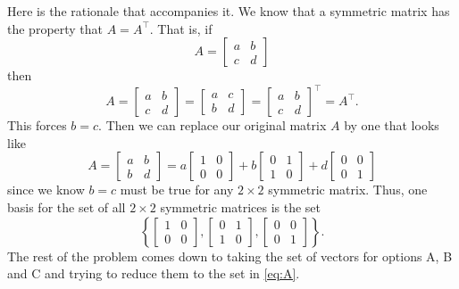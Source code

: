 \begin{questions}
\begin{solution}
    Here is the rationale that accompanies it. We know that a symmetric
    matrix has the property that $A=A^\intercal$. That is, if
    \[
      A=\begin{bmatrix}
        a&b\\c&d
        \end{bmatrix}
    \]
    then
    \[
      A=
      \begin{bmatrix}
        a&b\\c&d
      \end{bmatrix}
      =
      \begin{bmatrix}
        a&c\\b&d
      \end{bmatrix}
      =
      \begin{bmatrix}
        a&b\\c&d
      \end{bmatrix}^{\intercal}
      =A^{\intercal}.
    \]
    This forces $b=c$. Then we can replace our original matrix $A$ by one
    that looks like
    \[
      A=\begin{bmatrix}
        a&b\\
        b&d
      \end{bmatrix}=
      a\begin{bmatrix}
        1&0\\
        0&0
      \end{bmatrix}+
      b\begin{bmatrix}
        0&1\\
        1&0
      \end{bmatrix}+
      d\begin{bmatrix}
        0&0\\
        0&1
      \end{bmatrix}
    \]
    since we know $b=c$ must be true for any $2\times 2$ symmetric matrix.
    Thus, one basis for the set of all $2\times 2$ symmetric matrices is
    the set
    \[
      \label{eq:A}
      \tag{$\star$} \left\{
        \begin{bmatrix}1&0\\0&0\end{bmatrix},
        \begin{bmatrix}0&1\\1&0\end{bmatrix},
        \begin{bmatrix}0&0\\0&1\end{bmatrix} \right\}.
    \]
    The rest of the problem comes down to taking the set of vectors for
    options A, B and C and trying to reduce them to the set in
    \eqref{eq:A}.
  \end{solution}


\end{questions}
